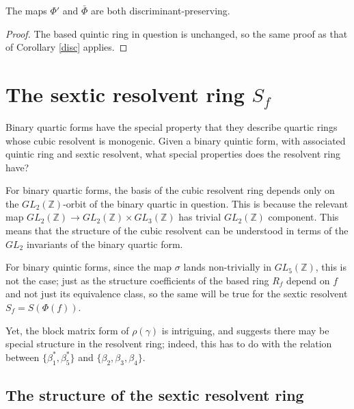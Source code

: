 \documentclass{article}
\begin{document}
\begin{corollary}
The maps $\Phi'$ and $\bar{\Phi}$ are both discriminant-preserving.
\end{corollary}
\begin{proof}
The based quintic ring in question is unchanged, so the same proof as that of Corollary \ref{disc} applies.
\end{proof}








\section{The sextic resolvent ring $S_f$} \label{sextic section}

Binary quartic forms have the special property that they describe quartic rings whose cubic resolvent is monogenic.  Given a binary quintic form, with associated quintic ring and sextic resolvent, what special properties does the resolvent ring have?

For binary quartic forms, the basis of the cubic resolvent ring depends only on the $GL_2(\mathbb{Z})$-orbit of the binary quartic in question.  This is because the relevant map $GL_2(\mathbb{Z}) \to GL_2(\mathbb{Z}) \times GL_3(\mathbb{Z})$ has trivial $GL_2(\mathbb{Z})$ component.  This means that the structure of the cubic resolvent can be understood in terms of the $GL_2$ invariants of the binary quartic form.

For binary quintic forms, since the map $\sigma$ lands non-trivially in $GL_5(\mathbb{Z})$, this is not the case; just as the structure coefficients of the based ring $R_f$ depend on $f$ and not just its equivalence class, so the same will be true for the sextic resolvent $S_f = S(\Phi(f))$.

Yet, the block matrix form of $\rho(\gamma)$ is intriguing, and suggests there may be special structure in the resolvent ring; indeed, this has to do with the relation between $\{ \beta_1^*, \beta_5^* \}$ and $\{ \beta_2, \beta_3, \beta_4 \}$.

\subsection{The structure of the sextic resolvent ring}
\end{document}
